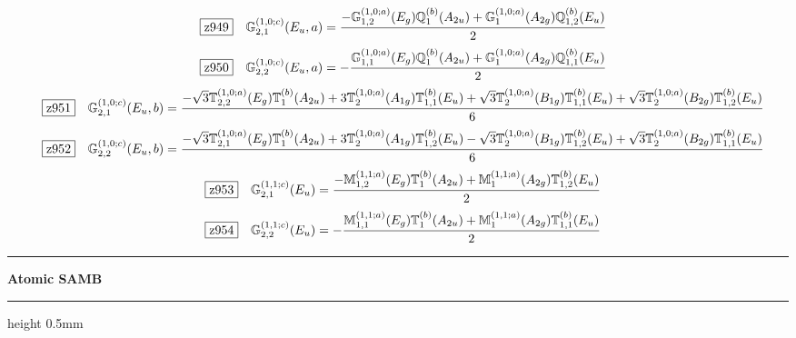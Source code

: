 \documentclass[fleqn,10pt,landscape]{jsarticle}
\begin{document}
\begin{dmath*}
\hspace*{3mm}\fbox{z949}\quad \mathbb{G}_{2,1}^{(1,0;c)}(E_{u},a)=\frac{- \mathbb{G}_{1,2}^{(1,0;a)}(E_{g}) \mathbb{Q}_{1}^{(b)}(A_{2u}) + \mathbb{G}_{1}^{(1,0;a)}(A_{2g}) \mathbb{Q}_{1,2}^{(b)}(E_{u})}{2}
\end{dmath*}
\begin{dmath*}
\hspace*{3mm}\fbox{z950}\quad \mathbb{G}_{2,2}^{(1,0;c)}(E_{u},a)=- \frac{\mathbb{G}_{1,1}^{(1,0;a)}(E_{g}) \mathbb{Q}_{1}^{(b)}(A_{2u}) + \mathbb{G}_{1}^{(1,0;a)}(A_{2g}) \mathbb{Q}_{1,1}^{(b)}(E_{u})}{2}
\end{dmath*}
\begin{dmath*}
\hspace*{3mm}\fbox{z951}\quad \mathbb{G}_{2,1}^{(1,0;c)}(E_{u},b)=\frac{- \sqrt{3} \mathbb{T}_{2,2}^{(1,0;a)}(E_{g}) \mathbb{T}_{1}^{(b)}(A_{2u}) + 3 \mathbb{T}_{2}^{(1,0;a)}(A_{1g}) \mathbb{T}_{1,1}^{(b)}(E_{u}) + \sqrt{3} \mathbb{T}_{2}^{(1,0;a)}(B_{1g}) \mathbb{T}_{1,1}^{(b)}(E_{u}) + \sqrt{3} \mathbb{T}_{2}^{(1,0;a)}(B_{2g}) \mathbb{T}_{1,2}^{(b)}(E_{u})}{6}
\end{dmath*}
\begin{dmath*}
\hspace*{3mm}\fbox{z952}\quad \mathbb{G}_{2,2}^{(1,0;c)}(E_{u},b)=\frac{- \sqrt{3} \mathbb{T}_{2,1}^{(1,0;a)}(E_{g}) \mathbb{T}_{1}^{(b)}(A_{2u}) + 3 \mathbb{T}_{2}^{(1,0;a)}(A_{1g}) \mathbb{T}_{1,2}^{(b)}(E_{u}) - \sqrt{3} \mathbb{T}_{2}^{(1,0;a)}(B_{1g}) \mathbb{T}_{1,2}^{(b)}(E_{u}) + \sqrt{3} \mathbb{T}_{2}^{(1,0;a)}(B_{2g}) \mathbb{T}_{1,1}^{(b)}(E_{u})}{6}
\end{dmath*}
\begin{dmath*}
\hspace*{3mm}\fbox{z953}\quad \mathbb{G}_{2,1}^{(1,1;c)}(E_{u})=\frac{- \mathbb{M}_{1,2}^{(1,1;a)}(E_{g}) \mathbb{T}_{1}^{(b)}(A_{2u}) + \mathbb{M}_{1}^{(1,1;a)}(A_{2g}) \mathbb{T}_{1,2}^{(b)}(E_{u})}{2}
\end{dmath*}
\begin{dmath*}
\hspace*{3mm}\fbox{z954}\quad \mathbb{G}_{2,2}^{(1,1;c)}(E_{u})=- \frac{\mathbb{M}_{1,1}^{(1,1;a)}(E_{g}) \mathbb{T}_{1}^{(b)}(A_{2u}) + \mathbb{M}_{1}^{(1,1;a)}(A_{2g}) \mathbb{T}_{1,1}^{(b)}(E_{u})}{2}
\end{dmath*}
\vspace{5mm}

\vspace{5mm}
\noindent \rule[0.5mm]{5mm}{0.5mm}\hspace{3mm}\textbf{Atomic SAMB}\hspace{3mm}\leaders\hrule height 0.5mm\hfill\kern0pt
\vspace{3mm}
\end{document}
